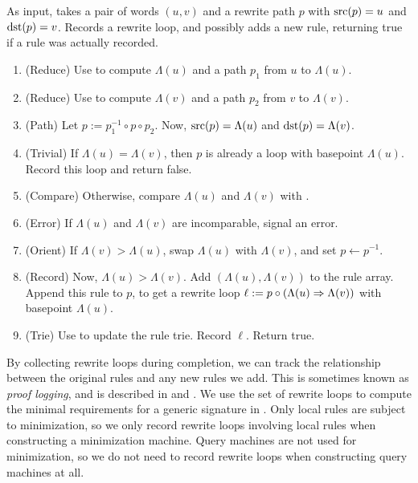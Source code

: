 \documentclass[../generics]{subfiles}
\begin{document}
\begin{algorithm}\label{add rule derived algo}
As input, takes a pair of words $(u, v)$ and a rewrite path $p$ with $\operatorname{src}(p)=u$ and $\operatorname{dst}(p)=v$. Records a rewrite loop, and possibly adds a new rule, returning true if a rule was actually recorded.
\begin{enumerate}
\item (Reduce) Use  to compute $\Lambda(u)$ and a path $p_1$ from $u$ to $\Lambda(u)$.
\item (Reduce) Use  to compute $\Lambda(v)$ and a path $p_2$ from $v$ to $\Lambda(v)$.
\item (Path) Let $p := p_1^{-1} \circ p \circ p_2$. Now, $\operatorname{src}(p)=\Lambda(u)$ and $\operatorname{dst}(p)=\Lambda(v)$.
\item {}(Trivial) If $\Lambda(u)=\Lambda(v)$, then $p$ is already a loop with basepoint $\Lambda(u)$. Record this loop and return false.
\item (Compare) Otherwise, compare $\Lambda(u)$ and $\Lambda(v)$ with .
\item (Error) If $\Lambda(u)$ and $\Lambda(v)$ are incomparable, signal an error.
\item (Orient) If $\Lambda(v)>\Lambda(u)$, swap $\Lambda(u)$ with $\Lambda(v)$, and set $p \leftarrow p^{-1}$.
\item (Record) Now, $\Lambda(u)>\Lambda(v)$. Add $(\Lambda(u),\Lambda(v))$ to the rule array. Append this rule to $p$, to get a rewrite loop $\ell := p \circ (\Lambda(u) \Rightarrow \Lambda(v))$ with basepoint $\Lambda(u)$.
\item (Trie) Use  to update the rule trie. Record $\ell$. Return true.
\end{enumerate}
\end{algorithm}

By collecting rewrite loops during completion, we can track the relationship between the original rules and any new rules we add. This is sometimes known as \emph{proof logging}, and is described in \cite{loggedrewriting} and \cite{homotopicalcompletion}. We use the set of rewrite loops to compute the minimal requirements for a generic signature in . Only local rules are subject to minimization, so we only record rewrite loops involving local rules when constructing a minimization machine. Query machines are not used for minimization, so we do not need to record rewrite loops when constructing query machines at all.
\end{document}
